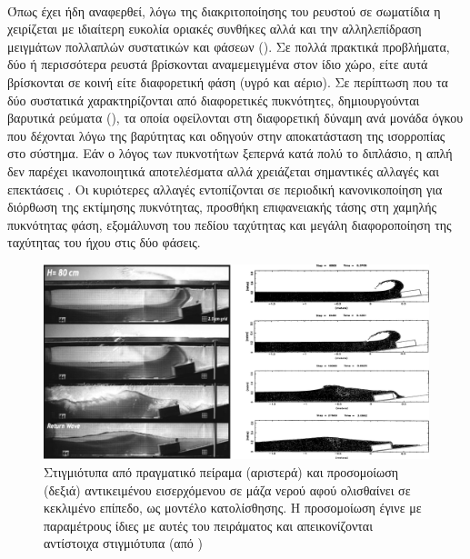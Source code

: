 \paragraph{} Όπως έχει ήδη αναφερθεί, λόγω της διακριτοποίησης του ρευστού σε σωματίδια η
 χειρίζεται με ιδιαίτερη ευκολία οριακές συνθήκες αλλά και την αλληλεπίδραση
μειγμάτων πολλαπλών συστατικών και φάσεων (). Σε πολλά
πρακτικά προβλήματα, δύο ή περισσότερα ρευστά βρίσκονται αναμεμειγμένα στον ίδιο χώρο,
είτε αυτά βρίσκονται σε κοινή είτε διαφορετική φάση (υγρό και αέριο). Σε περίπτωση που τα
δύο συστατικά χαρακτηρίζονται από διαφορετικές πυκνότητες, δημιουργούνται βαρυτικά ρεύματα
(), τα οποία οφείλονται στη διαφορετική δύναμη ανά μονάδα όγκου που
δέχονται λόγω της βαρύτητας και οδηγούν στην αποκατάσταση της ισορροπίας στο σύστημα. Εάν
ο λόγος των πυκνοτήτων ξεπερνά κατά πολύ το διπλάσιο, η απλή  δεν παρέχει
ικανοποιητικά αποτελέσματα αλλά χρειάζεται σημαντικές αλλαγές και επεκτάσεις
\cite{colagrossi2003448}. Οι κυριότερες αλλαγές εντοπίζονται σε περιοδική κανονικοποίηση
για διόρθωση της εκτίμησης πυκνότητας, προσθήκη επιφανειακής τάσης στη χαμηλής πυκνότητας
φάση, εξομάλυνση του πεδίου ταχύτητας και μεγάλη διαφοροποίηση της ταχύτητας του ήχου στις
δύο φάσεις.

\begin{figure}[]
  \centering
  \includegraphics[width=\textwidth]{figures/landslide.pdf}
  \caption[Προσομοίωση κατολίσθησης] {Στιγμιότυπα από πραγματικό πείραμα (αριστερά) και
    προσομοίωση (δεξιά) αντικειμένου εισερχόμενου σε μάζα νερού αφού ολισθαίνει σε
    κεκλιμένο επίπεδο, ως μοντέλο κατολίσθησης. Η προσομοίωση έγινε με παραμέτρους ίδιες
    με αυτές του πειράματος και απεικονίζονται αντίστοιχα στιγμιότυπα (από  \cite{monaghan2003fluid})}
  \label{fig:landslide}
\end{figure}

